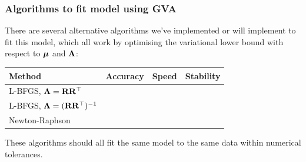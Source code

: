 \documentclass{beamer}
\begin{document}
\begin{frame}
	\frametitle{Algorithms to fit model using GVA}
	There are several alternative algorithms we've implemented or will implement
	to fit this model, which all work by optimising the variational lower bound with respect to
	${\boldsymbol \mu}$ and ${\boldsymbol \Lambda}$:
	\begin{tabular}{|l|ccc|}
		\hline
		Method & Accuracy & Speed & Stability \\
		\hline
		L-BFGS, ${\boldsymbol \Lambda} = {\bf R} {\bf R}^\top$ & \checkmark & & \checkmark \\
		L-BFGS, ${\boldsymbol \Lambda} = ({\bf R} {\bf R}^\top)^{-1}$ & \checkmark & \checkmark & \checkmark \\
		Newton-Raphson & \checkmark & \checkmark  &\\
		\hline
	\end{tabular}	

	These algorithms should all fit the same model to the same data
	within numerical tolerances.
\end{frame}
\end{document}
